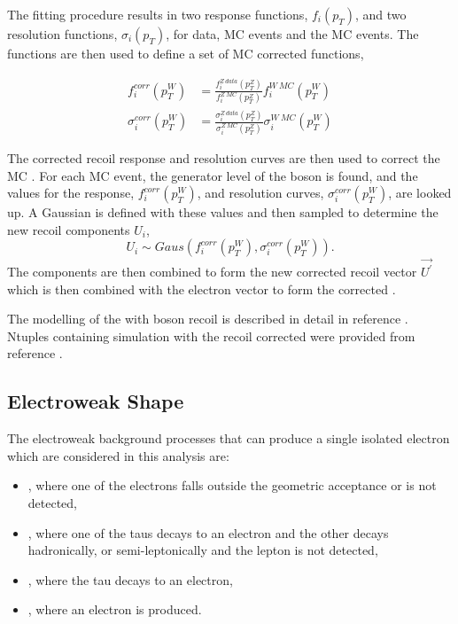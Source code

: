 The fitting procedure results in two response functions, $f_i(p_T)$, and two
resolution functions, $\sigma_i(p_T)$, for \PZ data, \PZ MC events and
the \PW MC events. The functions are then used to define a set of \PW
MC corrected functions, 

\begin{align}
f^{corr}_i (p^{W}_T)      
  &= \frac{ f^{Z\ data}_i (p^{Z}_T) }
          { f^{Z\ MC}_i (p^{Z}_T) }
          f^{W\ MC}_i (p^{W}_T) \\
\sigma^{corr}_i (p^{W}_T) 
  &= \frac{ \sigma^{Z\ data}_i (p^{Z}_T) }
          { \sigma^{Z\ MC}_i (p^{Z}_T) }
          \sigma^{W\ MC}_i (p^{W}_T) 
\end{align}

The corrected recoil response and resolution curves are then used to correct the
\PW MC \ETm. For each \PW MC event, the generator level \pT of the boson is
found, and the values for the response, $f^{corr}_i (p^{W}_T)$, and
resolution curves, $\sigma^{corr}_i (p^{W}_T) $, are looked up. A Gaussian is
defined with these values and then sampled to determine the new recoil
components $U_i$,
\begin{equation}
U_i \sim Gaus(f^{corr}_i (p^{W}_T), \sigma^{corr}_i (p^{W}_T) ).
\end{equation}
The components are then combined to form the new corrected recoil vector
$\vec{U^{\prime}}$ which is then combined with the electron vector to
form the corrected \ETm\cite{bauer2010modeling}.

The modelling of the \HepProcess{\PW\to\Plepton\Pnu} \ETm with boson recoil is
described in detail in reference \cite{bauer2010modeling}. 
Ntuples containing \HepProcess{\PW\to\Pelectron\Pnu} simulation with the recoil corrected \ETm were
provided from reference \cite{alcaraz2010updated}.

\subsection{{Electroweak} \ETm Shape}
The electroweak background processes that can produce a single isolated
electron which are considered in this analysis are:
\begin{itemize}
\item \HepProcess{\PZ\to\Pelectron\APelectron}, where one of the electrons falls
outside the geometric acceptance or is not detected,
\item \HepProcess{\PZ\to\Ptauon\APtauon}, where one of the taus decays
to an electron and the other decays hadronically, or semi-leptonically and the lepton
is not detected,
\item \HepProcess{\PW\to\Ptau\Pnu}, where the tau decays to an electron,
\item \HepProcess{\Ptop\APtop}, where an electron is produced.
\end{itemize}


